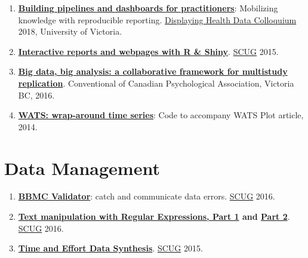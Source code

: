 \documentclass[
]{book}
\providecommand{\tightlist}{%
  \setlength{\itemsep}{0pt}\setlength{\parskip}{0pt}}
\begin{document}
\begin{enumerate}
\def\labelenumi{\arabic{enumi}.}
\tightlist
\item
  \textbf{\href{https://github.com/dss-ialh/displaying-health-data/blob/master/documentation/products/beasley/dhd-2018-uvic-3-a-beasley-2018-11-29.pdf}{Building pipelines and dashboards for practitioners}}: Mobilizing knowledge with reproducible reporting. \href{https://github.com/dss-ialh/displaying-health-data}{Displaying Health Data Colloquium} 2018, University of Victoria.
\item
  \textbf{\href{https://rawgit.com/OuhscBbmc/StatisticalComputing/master/2015_Presentations/10_October/beasley-scug-shiny-2015-10.html\#/}{Interactive reports and webpages with R \& Shiny}}. \href{https://github.com/OuhscBbmc/StatisticalComputing}{SCUG} 2015.
\item
  \textbf{\href{https://github.com/IALSA/IALSA-2015-Portland/blob/master/pubs/2016-talks/2016-06-09-cpa/ppt/koval-etal-2016-06-10-cpa.pdf}{Big data, big analysis: a collaborative framework for multistudy replication}}. Conventional of Canadian Psychological Association, Victoria BC, 2016.
\item
  \textbf{\href{https://github.com/OuhscBbmc/Wats}{WATS: wrap-around time series}}: Code to accompany WATS Plot article, 2014.
\end{enumerate}

\hypertarget{data-management}{%
\section{Data Management}\label{data-management}}

\begin{enumerate}
\def\labelenumi{\arabic{enumi}.}
\tightlist
\item
  \textbf{\href{https://rawgit.com/OuhscBbmc/StatisticalComputing/master/2016-presentations/11-november/beasley-scug-validator-2016-11.html\#/}{BBMC Validator}}: catch and communicate data errors. \href{https://github.com/OuhscBbmc/StatisticalComputing}{SCUG} 2016.
\item
  \textbf{\href{https://rawgit.com/OuhscBbmc/StatisticalComputing/master/2016-presentations/02-february/beasley-scug-regex-part-1-2016-02.html}{Text manipulation with Regular Expressions, Part 1} and \href{https://rawgit.com/OuhscBbmc/StatisticalComputing/master/2016-presentations/05-may/beasley-scug-regex-part-2-2016-05.html\#/}{Part 2}}. \href{https://github.com/OuhscBbmc/StatisticalComputing}{SCUG} 2016.
\item
  \textbf{\href{https://rawgit.com/wibeasley/RAnalysisSkeleton/master/documentation/time-and-effort-synthesis.html\#/}{Time and Effort Data Synthesis}}. \href{https://github.com/OuhscBbmc/StatisticalComputing}{SCUG} 2015.
\end{enumerate}
\end{document}
